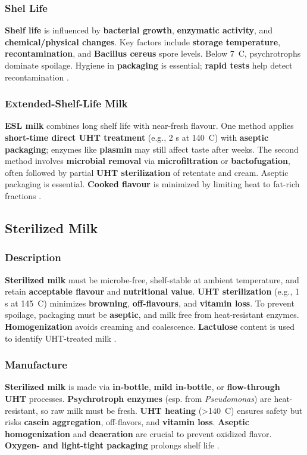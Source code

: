 \subsubsection*{Shel Life}
\textbf{Shelf life} is influenced by \textbf{bacterial growth}, \textbf{enzymatic activity}, and \textbf{chemical/physical changes}. Key factors include \textbf{storage temperature}, \textbf{recontamination}, and \textbf{Bacillus cereus} spore levels. Below 7~\textdegree C, psychrotrophs dominate spoilage. Hygiene in \textbf{packaging} is essential; \textbf{rapid tests} help detect recontamination \cite*{curr_rm_01_dairy_science_technology}.

\subsubsection*{Extended-Shelf-Life Milk}
\textbf{ESL milk} combines long shelf life with near-fresh flavour. One method applies \textbf{short-time direct UHT treatment} (e.g., 2 s at 140~\textdegree C) with \textbf{aseptic packaging}; enzymes like \textbf{plasmin} may still affect taste after weeks. The second method involves \textbf{microbial removal} via \textbf{microfiltration} or \textbf{bactofugation}, often followed by partial \textbf{UHT sterilization} of retentate and cream. Aseptic packaging is essential. \textbf{Cooked flavour} is minimized by limiting heat to fat-rich fractions \cite*{curr_rm_01_dairy_science_technology}. 

\subsection{Sterilized Milk}
\subsubsection{Description}
\textbf{Sterilized milk} must be microbe-free, shelf-stable at ambient temperature, and retain \textbf{acceptable flavour} and \textbf{nutritional value}. \textbf{UHT sterilization} (e.g., 1 s at 145~\textdegree C) minimizes \textbf{browning}, \textbf{off-flavours}, and \textbf{vitamin loss}. To prevent spoilage, packaging must be \textbf{aseptic}, and milk free from heat-resistant enzymes. \textbf{Homogenization} avoids creaming and coalescence. \textbf{Lactulose} content is used to identify UHT-treated milk \cite*{curr_rm_01_dairy_science_technology}.

\subsubsection*{Manufacture}
\textbf{Sterilized milk} is made via \textbf{in-bottle}, \textbf{mild in-bottle}, or \textbf{flow-through UHT} processes. \textbf{Psychrotroph enzymes} (esp. from \textit{Pseudomonas}) are heat-resistant, so raw milk must be fresh. \textbf{UHT heating} (>140~\textdegree C) ensures safety but risks \textbf{casein aggregation}, off-flavors, and \textbf{vitamin loss}. \textbf{Aseptic homogenization} and \textbf{deaeration} are crucial to prevent oxidized flavor. \textbf{Oxygen- and light-tight packaging} prolongs shelf life \cite*{curr_rm_01_dairy_science_technology}. 

